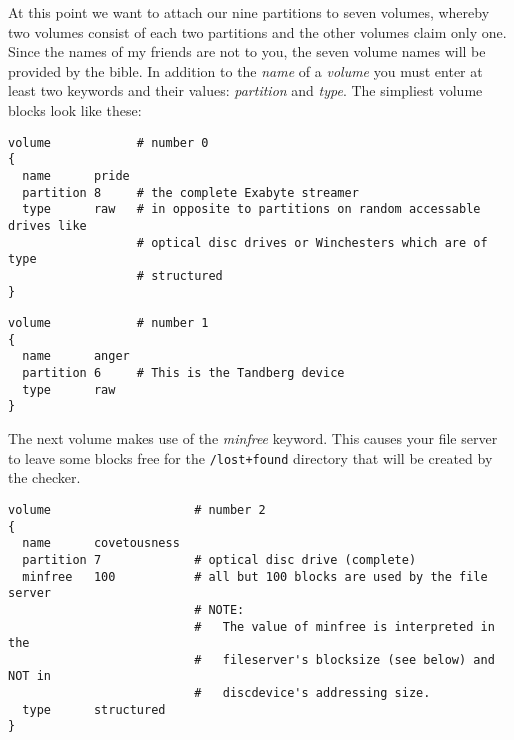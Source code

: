 At this point we want to attach our nine partitions to seven volumes, whereby
two volumes consist of each two partitions and the other volumes claim only 
one. Since the names of my friends are not to you, the seven volume names will
be provided by the bible. In addition to the {\it name}
of a {\it volume} you must enter at least two
keywords and their values: {\it partition}
and {\it type}. The simpliest volume blocks look like
these:

\begin{listing}
  \begin{verbatim}
volume            # number 0
{
  name      pride
  partition 8     # the complete Exabyte streamer
  type      raw   # in opposite to partitions on random accessable drives like
                  # optical disc drives or Winchesters which are of type 
                  # structured
}

  \end{verbatim}
\end{listing}
\begin{listing}
  \begin{verbatim}
volume            # number 1
{
  name      anger 
  partition 6     # This is the Tandberg device
  type      raw
}
  \end{verbatim}
\end{listing}

The next volume makes use of the {\it minfree}
keyword. This causes your file server to leave some blocks free for the
{\tt /lost+found} directory that will be
created by the checker.

\begin{listing}
  \begin{verbatim}
volume                    # number 2
{
  name      covetousness
  partition 7             # optical disc drive (complete)
  minfree   100           # all but 100 blocks are used by the file server
                          # NOTE:
                          #   The value of minfree is interpreted in the
                          #   fileserver's blocksize (see below) and NOT in
                          #   discdevice's addressing size. 
  type      structured
}
  \end{verbatim}
\end{listing}

